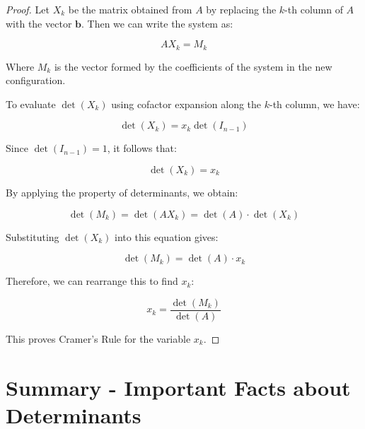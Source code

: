 \documentclass[10pt, oneside]{article}
\begin{document}
\begin{proof}
	Let \( X_k \) be the matrix obtained from \( A \) by replacing the \( k \)-th column of \( A \) with the vector \( \mathbf{b} \). Then we can write the system as:

	\[
		A X_k = M_k
	\]

	Where \( M_k \) is the vector formed by the coefficients of the system in the new configuration.

	To evaluate \( \det(X_k) \) using cofactor expansion along the \( k \)-th column, we have:

	\[
		\det(X_k) = x_k \det(I_{n-1})
	\]

	Since \( \det(I_{n-1}) = 1 \), it follows that:

	\[
		\det(X_k) = x_k
	\]

	By applying the property of determinants, we obtain:

	\[
		\det(M_k) = \det(A X_k) = \det(A) \cdot \det(X_k)
	\]

	Substituting \( \det(X_k) \) into this equation gives:

	\[
		\det(M_k) = \det(A) \cdot x_k
	\]

	Therefore, we can rearrange this to find \( x_k \):

	\[
		x_k = \frac{\det(M_k)}{\det(A)}
	\]

	This proves Cramer's Rule for the variable \( x_k \).
\end{proof}
\section{Summary - Important Facts about Determinants}
\end{document}
